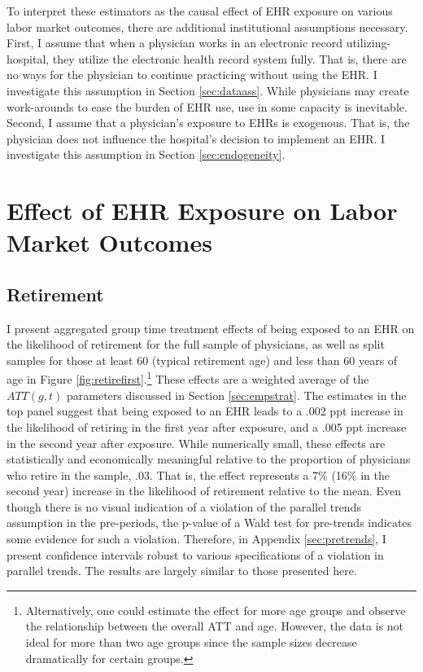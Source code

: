 \documentclass[12pt]{article}
\begin{document}
To interpret these estimators as the causal effect of EHR exposure on various labor market outcomes, there are additional institutional assumptions necessary. First, I assume that when a physician works in an electronic record utilizing-hospital, they utilize the electronic health record system fully. That is, there are no ways for the physician to continue practicing without using the EHR. I investigate this assumption in Section \ref{sec:dataass}. While physicians may create work-arounds to ease the burden of EHR use, use in some capacity is inevitable. Second, I assume that a physician's exposure to EHRs is exogenous. That is, the physician does not influence the hospital's decision to implement an EHR. I investigate this assumption in Section \ref{sec:endogeneity}. 





\section{Effect of EHR Exposure on Labor Market Outcomes}


\subsection{Retirement}\label{sec:retire}


I present aggregated group time treatment effects of being exposed to an EHR on the likelihood of retirement for the full sample of physicians, as well as split samples for those at least 60 (typical retirement age) and less than 60 years of age in Figure \ref{fig:retirefirst}.\footnote{Alternatively, one could estimate the effect for more age groups and observe the relationship between the overall ATT and age. However, the data is not ideal for more than two age groups since the sample sizes decrease dramatically for certain groups.} These effects are a weighted average of the $ATT(g,t)$ parameters discussed in Section \ref{sec:empstrat}. The estimates in the top panel suggest that being exposed to an EHR leads to a .002 ppt increase in the likelihood of retiring in the first year after exposure, and a .005 ppt increase in the second year after exposure. While numerically small, these effects are statistically and economically meaningful relative to the proportion of physicians who retire in the sample, .03. That is, the effect represents a 7\% (16\% in the second year) increase in the likelihood of retirement relative to the mean. Even though there is no visual indication of a violation of the parallel trends assumption in the pre-periods, the p-value of a Wald test for pre-trends indicates some evidence for such a violation. Therefore, in Appendix \ref{sec:pretrends}, I present confidence intervals robust to various specifications of a violation in parallel trends. The results are largely similar to those presented here.
\end{document}
